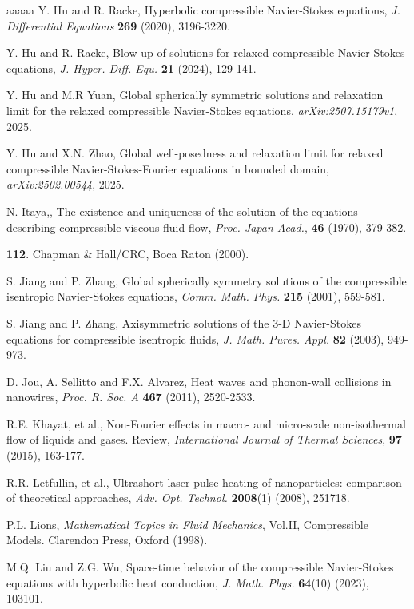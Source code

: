 \documentclass[11pt,reqno]{amsart}
\numberwithin{equation}{section}
\begin{document}
\begin{thebibliography}{aaaaa}
 Y. Hu and R. Racke, Hyperbolic compressible Navier-Stokes equations, \textit{J. Differential Equations} \textbf{269} (2020), 3196-3220.

 Y. Hu and R. Racke, Blow-up of solutions for relaxed compressible Navier-Stokes equations, \textit{J. Hyper. Diff. Equ.} \textbf{21} (2024), 129-141.

 Y. Hu and M.R Yuan,  Global spherically symmetric solutions and relaxation limit for the relaxed compressible Navier-Stokes equations, \textit{arXiv:2507.15179v1}, 2025.

 Y. Hu and X.N. Zhao, Global well-posedness and relaxation limit for relaxed compressible Navier-Stokes-Fourier equations in bounded domain, \textit{arXiv:2502.00544}, 2025.

 N. Itaya,, The existence and uniqueness of the solution of the equations describing compressible viscous fluid flow, \textit{Proc. Japan Acad.}, \textbf{46} (1970), 379-382.

   \textbf{112}. Chapman \& Hall/CRC, Boca Raton (2000).

   S. Jiang and P. Zhang, Global spherically symmetry solutions of the compressible isentropic
Navier-Stokes equations, \textit{Comm. Math. Phys.} \textbf{215} (2001), 559-581.

 S. Jiang and P. Zhang, Axisymmetric solutions of the 3-D Navier-Stokes equations for compressible isentropic fluids, \textit{J. Math. Pures. Appl.} \textbf{82} (2003), 949-973.


  D. Jou, A. Sellitto and F.X. Alvarez, Heat waves and phonon-wall collisions in nanowires, \textit{Proc. R. Soc. A} \textbf{ 467} (2011), 2520-2533.

 R.E. Khayat, et al., Non-Fourier effects in macro- and micro-scale non-isothermal flow of liquids and gases. Review, \textit{International Journal of Thermal Sciences}, \textbf{97} (2015), 163-177.

 R.R. Letfullin, et al., Ultrashort laser pulse heating of nanoparticles: comparison of theoretical approaches, \textit{Adv. Opt. Technol.} \textbf{2008}(1) (2008), 251718.


  P.L. Lions, \textit{Mathematical Topics in Fluid Mechanics}, Vol.II, Compressible Models. Clarendon Press, Oxford (1998).

	M.Q. Liu and Z.G. Wu, Space-time behavior of the compressible Navier-Stokes equations with hyperbolic heat conduction, \textit{J. Math. Phys.}\textbf{ 64}(10) (2023), 103101.



\end{thebibliography}
\end{document}
